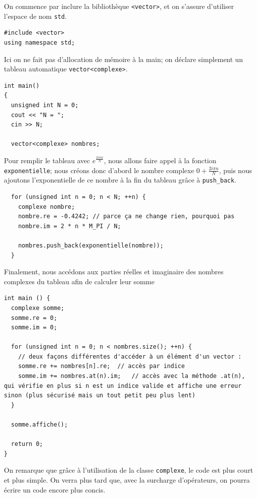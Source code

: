 \documentclass{book}
\newcommand{\inline}[1]{\texttt{#1}}
\begin{document}
\begin{correction}
On commence par inclure la bibliothèque \inline{<vector>}, et on s'assure d'utiliser l'espace de nom \inline{std}.
\begin{verbatim}
#include <vector>
using namespace std;
\end{verbatim}

Ici on ne fait pas d'allocation de mémoire à la main; on déclare simplement un tableau automatique \inline{vector<complexe>}. 
\begin{verbatim}
int main() 
{
  unsigned int N = 0;
  cout << "N = ";
  cin >> N;

  vector<complexe> nombres;
\end{verbatim}

Pour remplir le tableau avec $e^{\frac{2i\pi n}{N}}$, nous allons faire appel à la fonction \inline{exponentielle}; nous créons donc d'abord le nombre complexe $0 + \frac{2i\pi n}{N}$, puis nous ajoutons l'exponentielle de ce nombre à la fin du tableau grâce à \inline{push_back}.
\begin{verbatim}
  for (unsigned int n = 0; n < N; ++n) {
    complexe nombre;
    nombre.re = -0.4242; // parce ça ne change rien, pourquoi pas
    nombre.im = 2 * n * M_PI / N;
    
    nombres.push_back(exponentielle(nombre));
  }
\end{verbatim}

Finalement, nous accédons aux parties réelles et imaginaire des nombres complexes du tableau afin de calculer leur somme
\begin{verbatim}
int main () {
  complexe somme;
  somme.re = 0;
  somme.im = 0;
  
  for (unsigned int n = 0; n < nombres.size(); ++n) {
    // deux façons différentes d'accéder à un élément d'un vector :
    somme.re += nombres[n].re;  // accès par indice
    somme.im += nombres.at(n).im;   // accès avec la méthode .at(n), qui vérifie en plus si n est un indice valide et affiche une erreur sinon (plus sécurisé mais un tout petit peu plus lent)
  }

  somme.affiche();

  return 0;
}
\end{verbatim}
On remarque que grâce à l'utilisation de la classe \inline{complexe}, le code est plus court et plus simple. On verra plus tard que, avec la surcharge d'opérateurs, on pourra écrire un code encore plus concis.
\end{correction}
\end{document}
